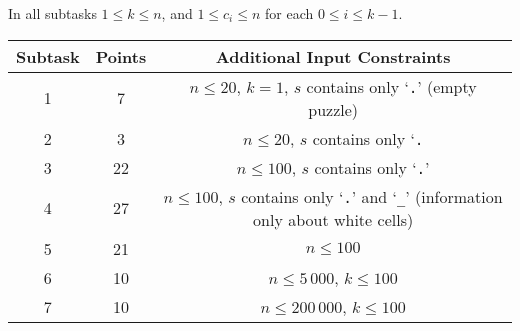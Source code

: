 In all subtasks $1 \le k \le n$, and $1\le c_i\le n$ for each $0 \le i \le k - 1$.

\begin{center}
\renewcommand{\arraystretch}{1.5}
\begin{tabular}{|c|c|c|}
\hline
Subtask & Points & Additional Input Constraints\\
\hline
1 & 7 & $n\leq 20$, $k = 1$, $s$ contains only `\texttt{.}' (empty puzzle) \\
\hline
2 & 3 & $n\leq 20$, $s$ contains only `\texttt{.} \\
\hline
3 & 22 & $n\leq 100$, $s$ contains only `\texttt{.}' \\
\hline
4 & 27 & $n\leq 100$, $s$ contains only `\texttt{.}' and `\texttt{\_}' (information only about white cells) \\
\hline
5 & 21 & $n\leq 100$ \\
\hline
6 & 10 & $n\leq 5\,000$, $k\leq 100$ \\
\hline
7 & 10 & $n\leq 200\,000$, $k\leq 100$ \\
\hline
\end{tabular}
\end{center}